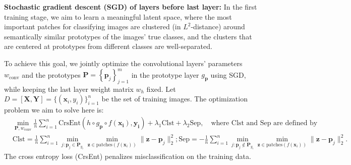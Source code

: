 \documentclass{article}
\theoremstyle{definition}
\theoremstyle{remark}
\begin{document}
\textbf{Stochastic gradient descent (SGD) of layers before last layer:} In the first training stage, we aim to learn a meaningful latent space, where the most important patches for classifying images are clustered (in $L^2$-distance) around semantically similar prototypes of the images' true classes, and the clusters that are centered at prototypes from different classes are well-separated.

To achieve this goal, we jointly optimize the convolutional layers' parameters $w_{\text{conv}}$ and the prototypes $\mathbf{P} = \left\{\mathbf{p}_j\right\}_{j=1}^{m}$ in the prototype layer $g_{\mathbf{p}}$ using SGD, while keeping the last layer weight matrix $w_h$ fixed. Let $D = [\mathbf{X}, \mathbf{Y}]= \{(\mathbf{x}_i, y_i)\}_{i=1}^n$ be the set of training images.
The optimization problem we aim to solve here is: %
\begin{equation*}
\begin{split}
&\min_{\mathbf{P},w_{\text{conv}}} \frac{1}{n}\sum_{i=1}^n \textrm{CrsEnt}(h \circ g_{\mathbf{p}} \circ f(\mathbf{x_i}), \mathbf{y_i}) + \lambda_1\textrm{Clst} + \lambda_2\textrm{Sep}, \quad \text{where Clst and Sep are defined by}\\
&\textrm{Clst} = \frac{1}{n}\sum_{i=1}^n \min_{j: \mathbf{p}_j \in \mathbf{P}_{y_i}} \min_{\mathbf{z} \in \text{patches}(f(\mathbf{x}_i))} \| \mathbf{z} - \mathbf{p}_j\|_2^2;\textrm{Sep} = -\frac{1}{n}\sum_{i=1}^n \min_{j: \mathbf{p}_j \not\in \mathbf{P}_{y_i}} \min_{\mathbf{z} \in \text{patches}(f(\mathbf{x}_i))} \|\mathbf{z} - \mathbf{p}_j\|_2^2.
\end{split}
\end{equation*}
The cross entropy loss (CrsEnt) penalizes misclassification on the training data. %
\end{document}

